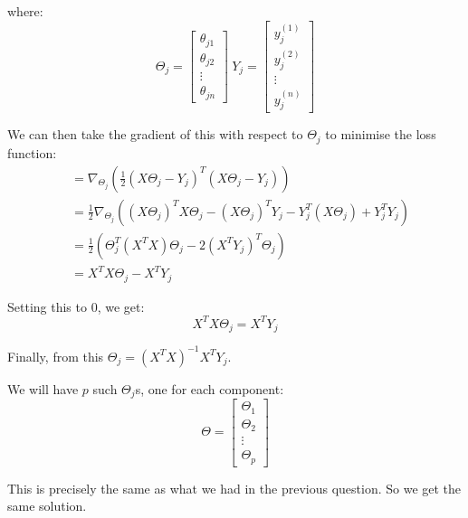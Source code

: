 \documentclass[a4paper]{article}
\begin{document}
where:
\begin{equation*}
    \Theta_j = \begin{bmatrix}
        \theta_{j1} \\
        \theta_{j2} \\
        \vdots \\
        \theta_{jn}
    \end{bmatrix}\  Y_j = \begin{bmatrix}
        y_j^{(1)} \\
        y_j^{(2)} \\
        \vdots \\
        y_j^{(n)}
    \end{bmatrix}
\end{equation*}

We can then take the gradient of this with respect to $\Theta_j$ to minimise the loss function:
\begin{align*}
    &= \nabla_{\Theta_j} \left( \frac{1}{2} (X\Theta_j - Y_j)^T(X\Theta_j - Y_j) \right)\\
    &= \frac{1}{2} \nabla_{\Theta_j} \left( (X\Theta_j)^TX\Theta_j - (X\Theta_j)^TY_j - Y_j^T(X\Theta_j) + Y_j^TY_j \right)\\
    &= \frac{1}{2} \left( \Theta_j^T(X^TX)\Theta_j - 2(X^TY_j)^T\Theta_j \right)\\
    &= X^TX\Theta_j - X^TY_j
\end{align*}

Setting this to 0, we get:
\begin{equation*}
    X^TX\Theta_j = X^TY_j
\end{equation*}

Finally, from this $\Theta_j = (X^TX)^{-1}X^TY_j$.

We will have $p$ such $\Theta_j$s, one for each component:
\begin{equation*}
    \Theta = \begin{bmatrix}
        \Theta_1 \\
        \Theta_2 \\
        \vdots \\
        \Theta_p
    \end{bmatrix}
\end{equation*}

This is precisely the same as what we had in the previous question. So we get the same solution.
\end{document}
